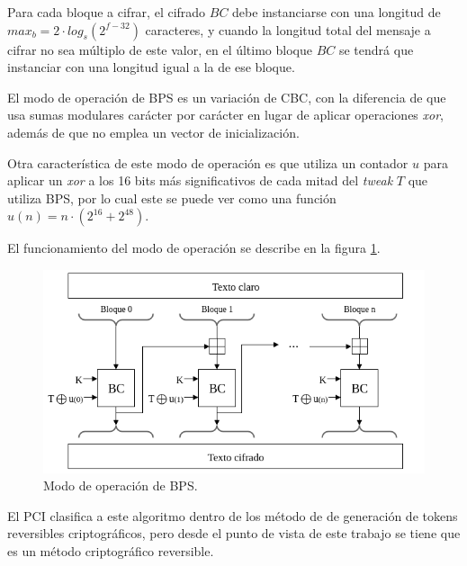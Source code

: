 Para cada bloque a cifrar, el cifrado $BC$ debe instanciarse con una longitud
de $max_b = 2 \cdot log_s(2^{f-32})$ caracteres, y cuando la longitud total
del mensaje a cifrar no sea múltiplo de este valor, en el último bloque $BC$
se tendrá que instanciar con una longitud igual a la de ese bloque.

El modo de operación de BPS es un variación de CBC, con la diferencia de que
usa sumas modulares carácter por carácter en lugar de aplicar operaciones
\textit{xor}, además de que no emplea un vector de inicialización.

Otra característica de este modo de operación es que utiliza un contador $u$
para aplicar un \textit{xor} a los 16 bits más significativos de cada mitad
del \textit{tweak} $T$ que utiliza BPS, por lo cual este se puede ver como
una función $u(n) = n \cdot (2^{16} + 2^{48})$.

El funcionamiento del modo de operación se describe en la figura \ref{modo_bps}.

\begin{figure}
  \begin{center}
    \includegraphics[width=0.85\linewidth]
    {../../../diagramas_comunes/bps/modo_de_operacion_bps}
    \caption{Modo de operación de BPS.}
    \label{modo_bps}
   \end{center}
\end{figure}

El PCI clasifica a este algoritmo dentro de los método de de generación de
tokens reversibles criptográficos, pero desde el punto de vista de este
trabajo se tiene que es un método criptográfico reversible.
